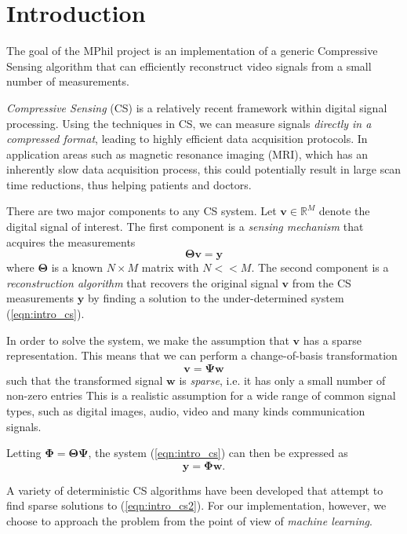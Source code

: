 \chapter{Introduction}
The goal of the MPhil project is an implementation of a generic Compressive Sensing algorithm that can efficiently reconstruct video signals from a small number of measurements.

\emph{Compressive Sensing} (CS) \cite{candes2006, donoho2006} is a relatively recent framework within digital signal processing.
Using the techniques in CS, we can measure signals \emph{directly in a compressed format}, leading to highly efficient data acquisition protocols.
In application areas such as magnetic resonance imaging (MRI), which has an inherently slow data acquisition process, this could potentially result in large scan time reductions, thus helping patients and doctors.

There are two major components to any CS system.
Let $\bm v \in\mathbb{R}^M$ denote the digital signal of interest.
The first component is a \emph{sensing mechanism} that acquires the measurements
\begin{equation}
  \label{eqn:intro_cs}
  \bm\Theta\bm v = \bm y
\end{equation}
where $\bm\Theta$ is a known $N\times M$ matrix with $N<<M$.
The second component is a \emph{reconstruction algorithm} that recovers the original signal $\bm v$ from the CS measurements $\bm y$ by finding a solution to the under-determined system (\ref{eqn:intro_cs}).

In order to solve the system, we make the assumption that $\bm v$ has a sparse representation.
This means that we can perform a change-of-basis transformation
\begin{equation}
  \label{eqn:intro_basis}
  \bm v = \bm\Psi\bm w
\end{equation}
such that the transformed signal $\bm w$ is \emph{sparse}, i.e. it has only a small number of non-zero entries
This is a realistic assumption for a wide range of common signal types, such as digital images, audio, video and many kinds communication signals.

Letting $\bm\Phi=\bm\Theta\bm\Psi$, the system (\ref{eqn:intro_cs}) can then be expressed as
\begin{equation}
  \label{eqn:intro_cs2}
  \bm y = \bm\Phi\bm w.
\end{equation}

A variety of deterministic CS algorithms have been developed that attempt to find sparse solutions to (\ref{eqn:intro_cs2}).
For our implementation, however, we choose to approach the problem from the point of view of \emph{machine learning}.

